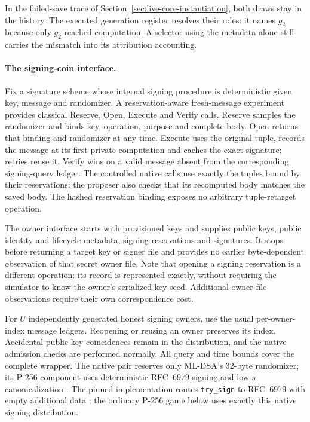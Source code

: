 In the failed-save trace of Section~\ref{sec:live-core-instantiation},
both draws stay in the history. The executed generation register resolves
their roles: it names $g_2$ because only $g_2$ reached computation.
A selector using the metadata alone still carries the mismatch into its
attribution accounting.

\paragraph{The signing-coin interface.}
Fix a signature scheme whose internal signing procedure is deterministic
given key, message and randomizer. A reservation-aware fresh-message
experiment provides classical Reserve, Open, Execute and Verify calls.
Reserve samples the randomizer and binds key, operation, purpose
and complete body. Open returns that binding and randomizer at any time.
Execute uses the original tuple, records the message at its first private
computation and caches the exact signature; retries reuse it. Verify wins
on a valid message absent from the corresponding signing-query ledger.
The controlled native calls use exactly the tuples bound by their
reservations; the proposer also checks that its recomputed body matches
the saved body. The hashed reservation binding exposes no arbitrary
tuple-retarget operation.

The owner interface starts with provisioned keys and supplies public keys,
public identity and lifecycle metadata, signing reservations and signatures.
It stops before returning a target key or signer file and provides no earlier
byte-dependent observation of that secret owner file. Note that opening
a signing reservation is a different operation: its record is represented
exactly, without requiring the simulator to know the owner's serialized
key seed. Additional owner-file observations require their own
correspondence cost.

For $U$ independently generated honest signing owners, use the usual
per-owner-index message ledgers. Reopening or reusing an owner preserves
its index. Accidental public-key coincidences remain in the distribution,
and the native admission checks are performed normally. All query and
time bounds cover the complete wrapper. The native pair reserves only
ML-DSA's 32-byte randomizer; its P-256 component uses deterministic
RFC~6979 signing and low-$s$ canonicalization
\cite{rfc6979,fips204}. The pinned implementation routes
\texttt{try\_sign} to RFC~6979 with empty additional data
\cite{rustcryptoEcdsa017}; the ordinary
P-256 game below uses exactly this native signing distribution.

